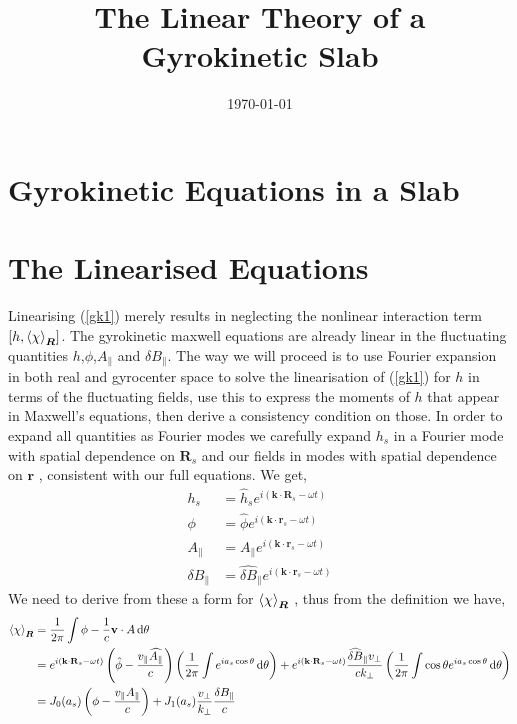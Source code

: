 \documentclass[prb,aps,amssymb,amsmath,a4paper]{revtex4}
\begin{document}
\date{\today}

\title{The Linear Theory of a Gyrokinetic Slab}

\maketitle


\section{Gyrokinetic Equations in a Slab}


\section{The Linearised Equations}


Linearising (\ref{gk1}) merely results in neglecting the nonlinear interaction term $[h,{\left< \chi \right>}_{\bm{R}}]$. The gyrokinetic maxwell equations are already linear in the fluctuating quantities $h$,$\phi$,$A_\parallel$ and $\delta B_\parallel$. The way we will proceed is to use Fourier expansion in both real and gyrocenter space to solve the linearisation of (\ref{gk1}) for $h$ in terms of the fluctuating fields, use this to express the moments of $h$ that appear in Maxwell's equations, then derive a consistency condition on those. In order to expand all quantities as Fourier modes we carefully expand $h_s$ in a Fourier mode with spatial dependence on $\mathbf{R}_s$ and our fields in modes with spatial dependence on $\mathbf{r}$ , consistent with our full equations. We get,
\begin{align}
\nonumber
h_s &= \hat{h}_s e^{i \left( \mathbf{k}\cdot\mathbf{R}_s - \omega t \right)}\\\nonumber 
\phi &= \hat\phi e^{i \left( \mathbf{k}\cdot\mathbf{r}_s - \omega t \right)}\\\nonumber 
A_\parallel &= \widehat{A_\parallel} e^{i \left( \mathbf{k}\cdot\mathbf{r}_s - \omega t \right)}\\\nonumber 
\delta B_\parallel &= \widehat{\delta B}_\parallel e^{i \left( \mathbf{k}\cdot\mathbf{r}_s - \omega t \right)}
\end{align}
We need to derive from these a form for ${\left< \chi \right>}_{\bm{R}}$ , thus from the definition we have,
\begin{align}
\nonumber
{\left< \chi \right>}_{\bm{R}} &= \frac{1}{2\pi} \int \phi - \frac{1}{c} \mathbf{v}\cdot{A} \,\mathrm{d}\theta\\\nonumber
&= e^{i \left( \mathbf{k}\cdot\mathbf{R}_s - \omega t \right)} \left( \hat{\phi} - \frac{v_\parallel \widehat{A_\parallel}}{c}\right)\left(\frac{1}{2\pi} \int e^{i a_s \cos \theta} \,\mathrm{d}\theta \right) + e^{i \left( \mathbf{k}\cdot\mathbf{R}_s - \omega t \right)}\frac{\widehat{\delta B}_\parallel v_\perp}{c k_\perp} \left(\frac{1}{2\pi} \int \cos\theta e^{i a_s \cos \theta} \,\mathrm{d}\theta\right) \\\nonumber
	&= J_0(a_s) \left( \phi - \frac{v_\parallel A_\parallel}{c} \right) + J_1(a_s) \frac{v_\perp}{k_\perp} \frac{\delta B_\parallel }{c}
\end{align}
\end{document}

